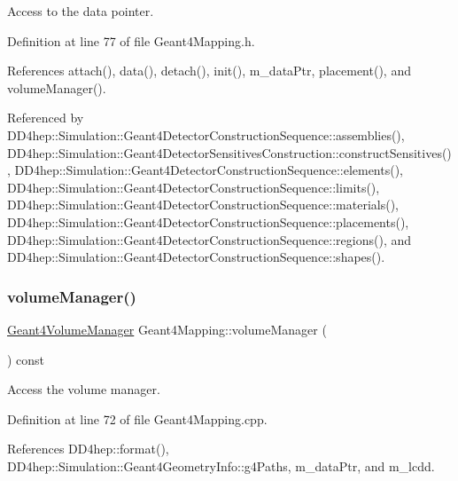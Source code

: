 Access to the data pointer. 



Definition at line 77 of file Geant4\+Mapping.\+h.



References attach(), data(), detach(), init(), m\+\_\+data\+Ptr, placement(), and volume\+Manager().



Referenced by D\+D4hep\+::\+Simulation\+::\+Geant4\+Detector\+Construction\+Sequence\+::assemblies(), D\+D4hep\+::\+Simulation\+::\+Geant4\+Detector\+Sensitives\+Construction\+::construct\+Sensitives(), D\+D4hep\+::\+Simulation\+::\+Geant4\+Detector\+Construction\+Sequence\+::elements(), D\+D4hep\+::\+Simulation\+::\+Geant4\+Detector\+Construction\+Sequence\+::limits(), D\+D4hep\+::\+Simulation\+::\+Geant4\+Detector\+Construction\+Sequence\+::materials(), D\+D4hep\+::\+Simulation\+::\+Geant4\+Detector\+Construction\+Sequence\+::placements(), D\+D4hep\+::\+Simulation\+::\+Geant4\+Detector\+Construction\+Sequence\+::regions(), and D\+D4hep\+::\+Simulation\+::\+Geant4\+Detector\+Construction\+Sequence\+::shapes().

\hypertarget{class_d_d4hep_1_1_simulation_1_1_geant4_mapping_a1109a515d9cbac6d58760b647e3272d2}{}\label{class_d_d4hep_1_1_simulation_1_1_geant4_mapping_a1109a515d9cbac6d58760b647e3272d2} 
\subsubsection{\texorpdfstring{volume\+Manager()}{volumeManager()}}
{\footnotesize\ttfamily \hyperlink{class_d_d4hep_1_1_simulation_1_1_geant4_volume_manager}{Geant4\+Volume\+Manager} Geant4\+Mapping\+::volume\+Manager (\begin{DoxyParamCaption}{ }\end{DoxyParamCaption}) const}



Access the volume manager. 



Definition at line 72 of file Geant4\+Mapping.\+cpp.



References D\+D4hep\+::format(), D\+D4hep\+::\+Simulation\+::\+Geant4\+Geometry\+Info\+::g4\+Paths, m\+\_\+data\+Ptr, and m\+\_\+lcdd.



